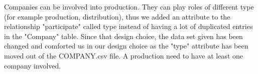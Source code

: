 \documentclass{article}
\begin{document}
    Companies can be involved into production. They can play roles of different type (for example production, distribution), thus we added an attribute to the relationship "participate" called type instead of having a lot of duplicated entries in the "Company" table. Since that design choice, the data set given has been changed and comforted us in our design choice as the "type" attribute has been moved out of the COMPANY.csv file. A production need to have at least one company involved. 
 
\end{document}
